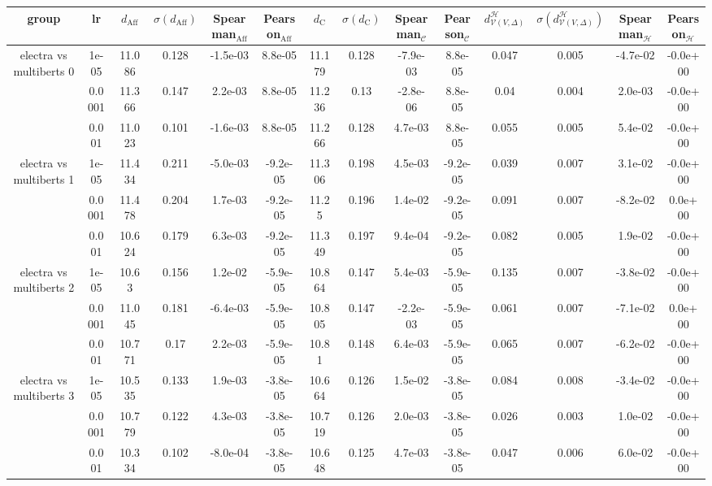 \begin{tabular}{|c|c|c|c|c|c|c|c|c|c|c|c|c|c|}
\hline
group & lr & $d_{\mathrm{Aff}}$ & $\sigma(d_{\mathrm{Aff}})$ & Spearman$_{\mathrm{Aff}}$ & Pearson$_{\mathrm{Aff}}$ & $d_{\mathrm{C}}$ & $\sigma(d_{\mathrm{C}})$ & Spearman$_{\mathcal{C}}$ & Pearson$_{\mathcal{C}}$ & $d^\mathcal{H}_{\mathcal{V}(V,\Delta)}$ & $\sigma(d^\mathcal{H}_{\mathcal{V}(V,\Delta)})$ & Spearman$_{\mathcal{H}}$ & Pearson$_{\mathcal{H}}$ \\
\hline
\multirow{3}{*}{electra  vs multiberts 0} & 1e-05 & 11.086 & 0.128 & -1.5e-03 & 8.8e-05 & 11.179 & 0.128 & -7.9e-03 & 8.8e-05 & 0.047 & 0.005 & -4.7e-02 & -0.0e+00 \\
 & 0.0001 & 11.366 & 0.147 & 2.2e-03 & 8.8e-05 & 11.236 & 0.13 & -2.8e-06 & 8.8e-05 & 0.04 & 0.004 & 2.0e-03 & -0.0e+00 \\
 & 0.001 & 11.023 & 0.101 & -1.6e-03 & 8.8e-05 & 11.266 & 0.128 & 4.7e-03 & 8.8e-05 & 0.055 & 0.005 & 5.4e-02 & -0.0e+00 \\
\hline
\multirow{3}{*}{electra  vs multiberts 1} & 1e-05 & 11.434 & 0.211 & -5.0e-03 & -9.2e-05 & 11.306 & 0.198 & 4.5e-03 & -9.2e-05 & 0.039 & 0.007 & 3.1e-02 & -0.0e+00 \\
 & 0.0001 & 11.478 & 0.204 & 1.7e-03 & -9.2e-05 & 11.25 & 0.196 & 1.4e-02 & -9.2e-05 & 0.091 & 0.007 & -8.2e-02 & 0.0e+00 \\
 & 0.001 & 10.624 & 0.179 & 6.3e-03 & -9.2e-05 & 11.349 & 0.197 & 9.4e-04 & -9.2e-05 & 0.082 & 0.005 & 1.9e-02 & -0.0e+00 \\
\hline
\multirow{3}{*}{electra  vs multiberts 2} & 1e-05 & 10.63 & 0.156 & 1.2e-02 & -5.9e-05 & 10.864 & 0.147 & 5.4e-03 & -5.9e-05 & 0.135 & 0.007 & -3.8e-02 & -0.0e+00 \\
 & 0.0001 & 11.045 & 0.181 & -6.4e-03 & -5.9e-05 & 10.805 & 0.147 & -2.2e-03 & -5.9e-05 & 0.061 & 0.007 & -7.1e-02 & 0.0e+00 \\
 & 0.001 & 10.771 & 0.17 & 2.2e-03 & -5.9e-05 & 10.81 & 0.148 & 6.4e-03 & -5.9e-05 & 0.065 & 0.007 & -6.2e-02 & -0.0e+00 \\
\hline
\multirow{3}{*}{electra  vs multiberts 3} & 1e-05 & 10.535 & 0.133 & 1.9e-03 & -3.8e-05 & 10.664 & 0.126 & 1.5e-02 & -3.8e-05 & 0.084 & 0.008 & -3.4e-02 & -0.0e+00 \\
 & 0.0001 & 10.779 & 0.122 & 4.3e-03 & -3.8e-05 & 10.719 & 0.126 & 2.0e-03 & -3.8e-05 & 0.026 & 0.003 & 1.0e-02 & -0.0e+00 \\
 & 0.001 & 10.334 & 0.102 & -8.0e-04 & -3.8e-05 & 10.648 & 0.125 & 4.7e-03 & -3.8e-05 & 0.047 & 0.006 & 6.0e-02 & -0.0e+00 \\

\end{tabular}
